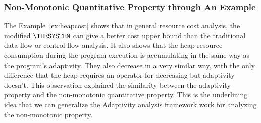\subsubsection{Non-Monotonic Quantitative Property through An Example}
\label{sec:nonmonotonic-example}
The Example~\ref{ex:heapcost} shows that in general 
resource cost analysis, the modified $\THESYSTEM$ can give a better cost upper bound than the traditional 
data-flow or control-flow analysis. It also shows that the heap resource consumption during the program 
execution is accumulating in the same way as the program's adaptivity. 
They also decrease in a very similar way,
with the only difference that the heap requires an operator for decreasing but adaptivity doesn't.
This observation explained the similarity between
the adaptivity property and the non-monotonic quantitative property. This is the underlining idea that we can generalize the Adaptivity analysis framework work for analyzing the non-monotonic property.

